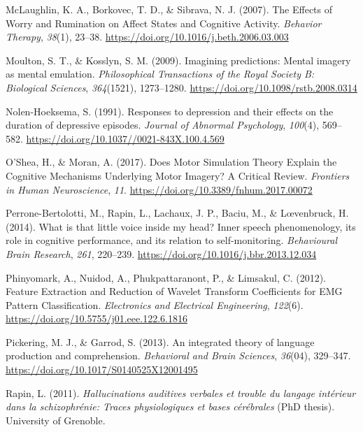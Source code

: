 \documentclass[a4paper,12pt,twoside,openright,oldfontcommands]{memoir}
\begin{document}
\hypertarget{ref-mclaughlin_effects_2007}{}
McLaughlin, K. A., Borkovec, T. D., \& Sibrava, N. J. (2007). The
Effects of Worry and Rumination on Affect States and Cognitive Activity.
\emph{Behavior Therapy}, \emph{38}(1), 23--38.
\url{https://doi.org/10.1016/j.beth.2006.03.003}

\hypertarget{ref-moulton_imagining_2009}{}
Moulton, S. T., \& Kosslyn, S. M. (2009). Imagining predictions: Mental
imagery as mental emulation. \emph{Philosophical Transactions of the
Royal Society B: Biological Sciences}, \emph{364}(1521), 1273--1280.
\url{https://doi.org/10.1098/rstb.2008.0314}

\hypertarget{ref-nolen-hoeksema_responses_1991}{}
Nolen-Hoeksema, S. (1991). Responses to depression and their effects on
the duration of depressive episodes. \emph{Journal of Abnormal
Psychology}, \emph{100}(4), 569--582.
\url{https://doi.org/10.1037//0021-843X.100.4.569}

\hypertarget{ref-oshea_does_2017}{}
O'Shea, H., \& Moran, A. (2017). Does Motor Simulation Theory Explain
the Cognitive Mechanisms Underlying Motor Imagery? A Critical Review.
\emph{Frontiers in Human Neuroscience}, \emph{11}.
\url{https://doi.org/10.3389/fnhum.2017.00072}

\hypertarget{ref-Perrone-Bertolotti2014}{}
Perrone-Bertolotti, M., Rapin, L., Lachaux, J. P., Baciu, M., \&
Lœvenbruck, H. (2014). What is that little voice inside my head? Inner
speech phenomenology, its role in cognitive performance, and its
relation to self-monitoring. \emph{Behavioural Brain Research},
\emph{261}, 220--239. \url{https://doi.org/10.1016/j.bbr.2013.12.034}

\hypertarget{ref-phinyomark_feature_2012}{}
Phinyomark, A., Nuidod, A., Phukpattaranont, P., \& Limsakul, C. (2012).
Feature Extraction and Reduction of Wavelet Transform Coefficients for
EMG Pattern Classification. \emph{Electronics and Electrical
Engineering}, \emph{122}(6).
\url{https://doi.org/10.5755/j01.eee.122.6.1816}

\hypertarget{ref-pickering_integrated_2013}{}
Pickering, M. J., \& Garrod, S. (2013). An integrated theory of language
production and comprehension. \emph{Behavioral and Brain Sciences},
\emph{36}(04), 329--347. \url{https://doi.org/10.1017/S0140525X12001495}

\hypertarget{ref-Rapin2011}{}
Rapin, L. (2011). \emph{Hallucinations auditives verbales et trouble du
langage intérieur dans la schizophrénie: Traces physiologiques et bases
cérébrales} (PhD thesis). University of Grenoble.
\end{document}
